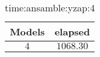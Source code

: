 \begin{table}[!ht]
	\centering
	\begin{tabular}{|c|c|}
		\hline
		Models & elapsed \\ \hline
		$4$ & $1068.30$ \\ \hline
	\end{tabular}
	\caption{time:ansamble:yzap:4}
	\label{tab:time:ansamble:yzap:4}
\end{table}
